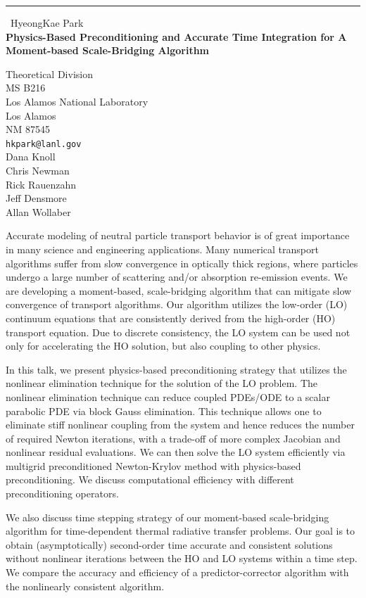 \documentclass{report}
\begin{document}
\begin{center}
\rule{6in}{1pt} \
{\large HyeongKae Park \\
{\bf Physics-Based Preconditioning and Accurate Time Integration for A Moment-based Scale-Bridging Algorithm}}

Theoretical Division \\ MS B216 \\ Los Alamos National Laboratory \\ Los Alamos \\ NM 87545
\\
{\tt hkpark@lanl.gov}\\
Dana Knoll\\
Chris Newman\\
Rick Rauenzahn\\
Jeff Densmore\\
Allan Wollaber\end{center}

Accurate modeling of neutral particle transport behavior is of great
importance in many science and engineering applications.
Many numerical transport algorithms suffer from slow convergence in
optically thick regions, where particles undergo a large number of
scattering and/or absorption re-emission events. We are developing a
moment-based, scale-bridging algorithm that can mitigate slow convergence
of transport algorithms. Our algorithm utilizes the low-order (LO)
continuum equations that are consistently derived from the high-order
(HO) transport equation. Due to discrete consistency, the LO system can
be used not only for accelerating the HO solution, but also coupling to
other physics.

In this talk, we present physics-based preconditioning strategy that
utilizes the nonlinear elimination technique for the solution of the LO
problem. The nonlinear elimination technique can reduce coupled PDEs/ODE
to a scalar parabolic PDE via block Gauss elimination. This technique
allows one to eliminate stiff nonlinear coupling from the system and
hence reduces the number of required Newton iterations, with a trade-off
of more complex Jacobian and nonlinear residual evaluations. We can then
solve the LO system efficiently via multigrid preconditioned
Newton-Krylov method with physics-based preconditioning. We discuss
computational efficiency with different preconditioning operators.

We also discuss time stepping strategy of our moment-based scale-bridging
algorithm for time-dependent thermal radiative transfer problems. Our
goal is to obtain (asymptotically) second-order time accurate and
consistent solutions without nonlinear iterations between the HO and LO
systems within a time step.
We compare the accuracy and efficiency of a predictor-corrector algorithm
with the nonlinearly consistent algorithm.
\end{document}

